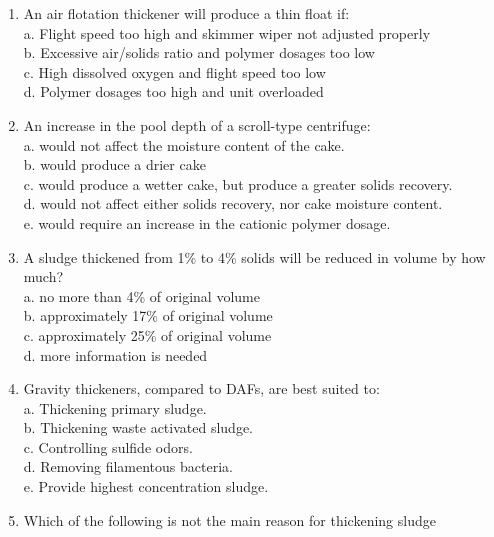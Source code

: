 \begin{tcolorbox}[breakable, enhanced,
colframe=blue!25,
colback=blue!10,
coltitle=blue!20!black,  
title= Chapter Assessment]
\begin{enumerate}
\item  An air flotation thickener will produce a thin float if: \\

a. Flight speed too high and skimmer wiper not adjusted properly \\
b. Excessive air/solids ratio and polymer dosages too low \\
c. High dissolved oxygen and flight speed too low \\
d. Polymer dosages too high and unit overloaded \\

\item  An increase in the pool depth of a scroll-type centrifuge: \\

a. would not affect the moisture content of the cake. \\
b. would produce a drier cake \\
c. would produce a wetter cake, but produce a greater solids recovery. \\
d. would not affect either solids recovery, nor cake moisture content. \\
e. would require an increase in the cationic polymer dosage. \\

\item  A sludge thickened from 1\% to 4\% solids will be reduced in volume by how much? \\

a. no more than 4\% of original volume \\
b. approximately 17\% of original volume \\
c. approximately 25\% of original volume \\
d. more information is needed \\

\item  Gravity thickeners, compared to DAFs, are best suited to: \\

a. Thickening primary sludge. \\
b. Thickening waste activated sludge. \\
c. Controlling sulfide odors. \\
d. Removing filamentous bacteria. \\
e. Provide highest concentration sludge. \\

\item  Which of the following is not the main reason for thickening sludge \\


\end{enumerate}
\end{tcolorbox}
